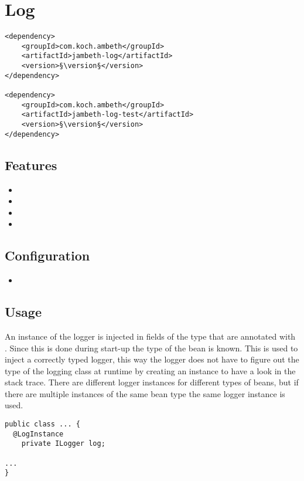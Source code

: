 \section{Log}
\label{module:Log}
\ClearAPI
\TODO
\begin{lstlisting}[style=POM,caption={Maven modules to use \emph{Ambeth Log}}]
<dependency>
	<groupId>com.koch.ambeth</groupId>
	<artifactId>jambeth-log</artifactId>
	<version>§\version§</version>
</dependency>

<dependency>
	<groupId>com.koch.ambeth</groupId>
	<artifactId>jambeth-log-test</artifactId>
	<version>§\version§</version>
</dependency>
\end{lstlisting}
\subsection{Features}
\begin{itemize}
	\item {}
	\item {}
	\item {}
	\item {}
\end{itemize}

\subsection{Configuration}
\begin{itemize}
	\item {}
\end{itemize}

\subsection{Usage}
An instance of the \AMBETH logger is injected in fields of the type  that are annotated with . Since this is done during start-up the type of the bean is known. This is used to inject a correctly typed logger, this way the logger does not have to figure out the type of the logging class at runtime by creating an  instance to have a look in the stack trace. There are different logger instances for different types of beans, but if there are multiple instances of the same bean type the same logger instance is used.

\begin{lstlisting}[style=Java,caption={Example of a logger injection field}]
public class ... {
  @LogInstance
	private ILogger log;

...
}
\end{lstlisting}
